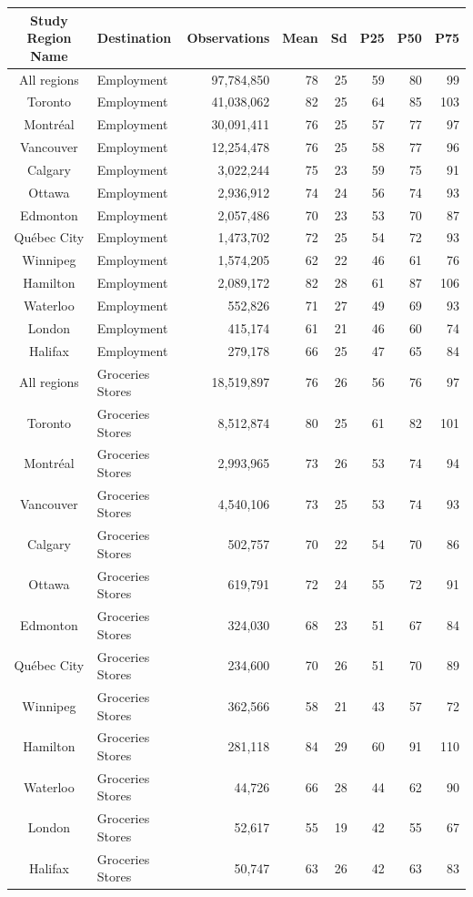 \documentclass[Royal,times,sageh]{sagej}
\begin{document}
\begingroup
\setlength{}
\setlength{}\fontsize{7.5pt}{9.0pt}\selectfont
\begin{longtable}{@{\extracolsep{\fill}}clrrrrrr}
\toprule
Study Region Name & Destination & Observations & Mean & Sd & P25 & P50 & P75 \\ 
\midrule\addlinespace[2.5pt]
All regions & Employment & 97,784,850 & 78 & 25 & 59 & 80 & 99 \\ 
Toronto & Employment & 41,038,062 & 82 & 25 & 64 & 85 & 103 \\ 
Montréal & Employment & 30,091,411 & 76 & 25 & 57 & 77 & 97 \\ 
Vancouver & Employment & 12,254,478 & 76 & 25 & 58 & 77 & 96 \\ 
Calgary & Employment & 3,022,244 & 75 & 23 & 59 & 75 & 91 \\ 
Ottawa & Employment & 2,936,912 & 74 & 24 & 56 & 74 & 93 \\ 
Edmonton & Employment & 2,057,486 & 70 & 23 & 53 & 70 & 87 \\ 
Québec City & Employment & 1,473,702 & 72 & 25 & 54 & 72 & 93 \\ 
Winnipeg & Employment & 1,574,205 & 62 & 22 & 46 & 61 & 76 \\ 
Hamilton & Employment & 2,089,172 & 82 & 28 & 61 & 87 & 106 \\ 
Waterloo & Employment & 552,826 & 71 & 27 & 49 & 69 & 93 \\ 
London & Employment & 415,174 & 61 & 21 & 46 & 60 & 74 \\ 
Halifax & Employment & 279,178 & 66 & 25 & 47 & 65 & 84 \\ 
All regions & Groceries Stores & 18,519,897 & 76 & 26 & 56 & 76 & 97 \\ 
Toronto & Groceries Stores & 8,512,874 & 80 & 25 & 61 & 82 & 101 \\ 
Montréal & Groceries Stores & 2,993,965 & 73 & 26 & 53 & 74 & 94 \\ 
Vancouver & Groceries Stores & 4,540,106 & 73 & 25 & 53 & 74 & 93 \\ 
Calgary & Groceries Stores & 502,757 & 70 & 22 & 54 & 70 & 86 \\ 
Ottawa & Groceries Stores & 619,791 & 72 & 24 & 55 & 72 & 91 \\ 
Edmonton & Groceries Stores & 324,030 & 68 & 23 & 51 & 67 & 84 \\ 
Québec City & Groceries Stores & 234,600 & 70 & 26 & 51 & 70 & 89 \\ 
Winnipeg & Groceries Stores & 362,566 & 58 & 21 & 43 & 57 & 72 \\ 
Hamilton & Groceries Stores & 281,118 & 84 & 29 & 60 & 91 & 110 \\ 
Waterloo & Groceries Stores & 44,726 & 66 & 28 & 44 & 62 & 90 \\ 
London & Groceries Stores & 52,617 & 55 & 19 & 42 & 55 & 67 \\ 
Halifax & Groceries Stores & 50,747 & 63 & 26 & 42 & 63 & 83 \\ 
\bottomrule
\end{longtable}
\endgroup
\end{document}
